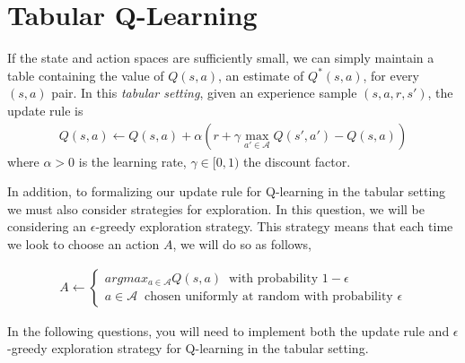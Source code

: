 \section{Tabular Q-Learning}

If the state and action spaces are sufficiently small, we can simply maintain a table containing the value of $Q(s,a)$, an estimate of $Q^*(s,a)$, for every $(s,a)$ pair.
In this \emph{tabular setting}, given an experience sample $(s, a, r, s')$, the update rule is
\begin{align*}
Q(s,a) \leftarrow Q(s,a) + \alpha\left(r + \gamma \max_{a' \in \mathcal{A}}Q(s',a') - Q(s,a)\right)
\end{align*}
where $\alpha > 0$ is the learning rate, $\gamma \in [0,1)$ the discount factor.

In addition, to formalizing our update rule for Q-learning in the tabular setting we must also consider strategies for exploration. In this question, we will be considering an $\epsilon$-greedy exploration strategy. This strategy means that each time we look to choose an action $A$, we will do so as follows,

\begin{align*}
A \leftarrow \begin{cases}
				argmax_{a \in \mathcal{A}} Q(s,a) \;\; \text{with probability $1-\epsilon$} \\
				a \in \mathcal{A}  \;\; \text{chosen uniformly at random with probability $\epsilon$}
			 \end{cases}
\end{align*}

In the following questions, you will need to implement both the update rule and $\epsilon$-greedy exploration strategy for Q-learning in the tabular setting. 

\begin{enumerate}[(a)]

	

	

\end{enumerate}